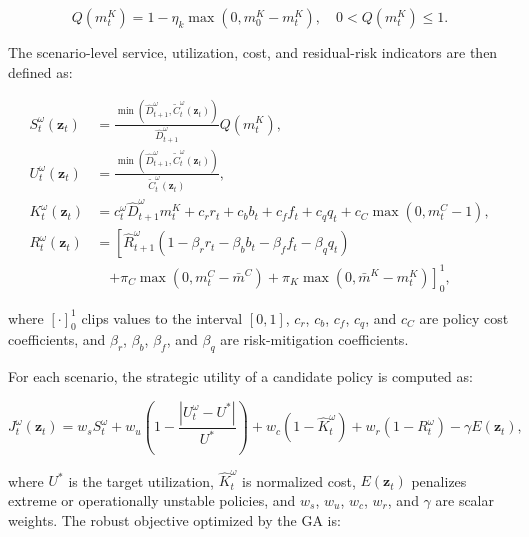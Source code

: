 \documentclass[apajournal,article,submit,pdftex,moreauthors]{Definitions/mdpi}
\begin{document}
\begin{linenomath}
\begin{equation}
Q(m^K_t)
=
1-\eta_k \max(0,m^K_0-m^K_t),
\quad
0<Q(m^K_t)\leq 1.
\label{eq:quality_penalty}
\end{equation}
\end{linenomath}

The scenario-level service, utilization, cost, and residual-risk indicators are then defined as:

\begin{linenomath}
\begin{align}
S_{t}^{\omega}(\mathbf{z}_t)
&=
\frac{
\min\left(\widehat{D}_{t+1}^{\omega},
\widetilde{C}_{t}^{\omega}(\mathbf{z}_t)\right)
}{
\widehat{D}_{t+1}^{\omega}
}
Q(m^K_t),
\label{eq:service_level}\\
U_{t}^{\omega}(\mathbf{z}_t)
&=
\frac{
\min\left(\widehat{D}_{t+1}^{\omega},
\widetilde{C}_{t}^{\omega}(\mathbf{z}_t)\right)
}{
\widetilde{C}_{t}^{\omega}(\mathbf{z}_t)
},
\label{eq:utilization}\\
K_{t}^{\omega}(\mathbf{z}_t)
&=
c_t^{\omega}\widehat{D}_{t+1}^{\omega}m^K_t
+
c_r r_t+c_b b_t+c_f f_t+c_q q_t
+
c_C\max(0,m^C_t-1),
\label{eq:cost}\\
R_{t}^{\omega}(\mathbf{z}_t)
&=
\left[
\widehat{R}_{t+1}^{\omega}
\left(
1-\beta_r r_t-\beta_b b_t-\beta_f f_t-\beta_q q_t
\right)
\right. \nonumber\\
&\quad \left.
+
\pi_C\max(0,m^C_t-\bar{m}^C)
+
\pi_K\max(0,\bar{m}^K-m^K_t)
\right]_{0}^{1},
\label{eq:risk}
\end{align}
\end{linenomath}
where $[\cdot]_{0}^{1}$ clips values to the interval $[0,1]$, $c_r$, $c_b$, $c_f$, $c_q$, and $c_C$ are policy cost coefficients, and $\beta_r$, $\beta_b$, $\beta_f$, and $\beta_q$ are risk-mitigation coefficients.

For each scenario, the strategic utility of a candidate policy is computed as:

\begin{linenomath}
\begin{equation}
J_{t}^{\omega}(\mathbf{z}_t)
=
w_s S_{t}^{\omega}
+
w_u
\left(
1-\frac{|U_{t}^{\omega}-U^{*}|}{U^{*}}
\right)
+
w_c
\left(
1-\widehat{K}_{t}^{\omega}
\right)
+
w_r
\left(
1-R_{t}^{\omega}
\right)
-
\gamma E(\mathbf{z}_t),
\label{eq:scenario_utility}
\end{equation}
\end{linenomath}
where $U^{*}$ is the target utilization, $\widehat{K}_{t}^{\omega}$ is normalized cost, $E(\mathbf{z}_t)$ penalizes extreme or operationally unstable policies, and $w_s$, $w_u$, $w_c$, $w_r$, and $\gamma$ are scalar weights. The robust objective optimized by the GA is:
\end{document}
